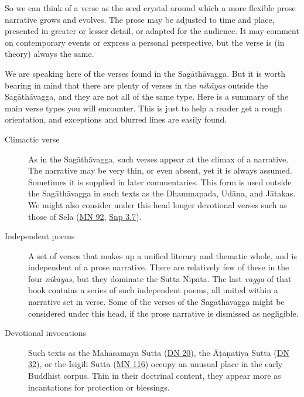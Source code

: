 \documentclass[12pt,openany]{book}%
\begin{document}
So we can think of a verse as the seed crystal around which a more flexible prose narrative grows and evolves. The prose may be adjusted to time and place, presented in greater or lesser detail, or adapted for the audience. It may comment on contemporary events or express a personal perspective, but the verse is (in theory) always the same.

We are speaking here of the verses found in the \textsanskrit{Sagāthāvagga}. But it is worth bearing in mind that there are plenty of verses in the \textit{\textsanskrit{nikāyas}} outside the \textsanskrit{Sagāthāvagga}, and they are not all of the same type. Here is a summary of the main verse types you will encounter. This is just to help a reader get a rough orientation, and exceptions and blurred lines are easily found.

\begin{description}%
\item[Climactic verse] As in the \textsanskrit{Sagāthāvagga}, such verses appear at the climax of a narrative. The narrative may be very thin, or even absent, yet it is always assumed. Sometimes it is supplied in later commentaries. This form is used outside the \textsanskrit{Sagāthāvagga} in such texts as the Dhammapada, \textsanskrit{Udāna}, and \textsanskrit{Jātakas}. We might also consider under this head longer devotional verses such as those of Sela (\href{https://suttacentral.net/mn92}{MN 92}, \href{https://suttacentral.net/snp3.7}{Snp 3.7}).%
\item[Independent poems] A set of verses that makes up a unified literary and thematic whole, and is independent of a prose narrative. There are relatively few of these in the four \textit{\textsanskrit{nikāyas}}, but they dominate the Sutta \textsanskrit{Nipāta}. The last \textit{vagga} of that book contains a series of such independent poems, all united within a narrative set in verse. Some of the verses of the \textsanskrit{Sagāthāvagga} might be considered under this head, if the prose narrative is dismissed as negligible.%
\item[Devotional invocations] Such texts as the \textsanskrit{Mahāsamaya} Sutta (\href{https://suttacentral.net/dn20}{DN 20}), the \textsanskrit{Āṭāṇātiya} Sutta (\href{https://suttacentral.net/dn32}{DN 32}), or the Isigili Sutta (\href{https://suttacentral.net/mn116}{MN 116}) occupy an unusual place in the early Buddhist corpus. Thin in their doctrinal content, they appear more as incantations for protection or blessings.%

\end{description}
\end{document}
